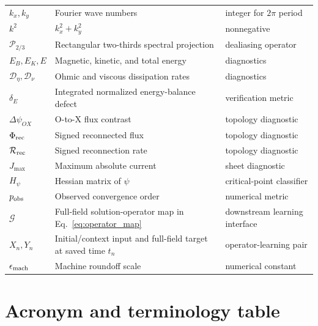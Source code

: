 \documentclass[11pt]{article}
\begin{document}
\begin{longtable}{p{}p{}p{}}
$k_x,k_y$ & Fourier wave numbers & integer for $2\pi$ period \\
$k^2$ & $k_x^2+k_y^2$ & nonnegative \\
$\mathcal P_{2/3}$ & Rectangular two-thirds spectral projection & dealiasing operator \\
$E_B,E_K,E$ & Magnetic, kinetic, and total energy & diagnostics \\
$\mathcal D_\eta,\mathcal D_\nu$ & Ohmic and viscous dissipation rates & diagnostics \\
$\delta_E$ & Integrated normalized energy-balance defect & verification metric \\
$\Delta\psi_{OX}$ & O-to-X flux contrast & topology diagnostic \\
$\Phi_{\rm rec}$ & Signed reconnected flux & topology diagnostic \\
$\mathcal R_{\rm rec}$ & Signed reconnection rate & topology diagnostic \\
$J_{\max}$ & Maximum absolute current & sheet diagnostic \\
$H_\psi$ & Hessian matrix of $\psi$ & critical-point classifier \\
$p_{\rm obs}$ & Observed convergence order & numerical metric \\
$\mathcal G$ & Full-field solution-operator map in Eq.~\eqref{eq:operator_map} & downstream learning interface \\
$X_n,Y_n$ & Initial/context input and full-field target at saved time $t_n$ & operator-learning pair \\
$\epsilon_{\rm mach}$ & Machine roundoff scale & numerical constant \\
\bottomrule
\end{longtable}
\normalsize

\section{Acronym and terminology table}
\label{app:acronyms}
\end{document}
